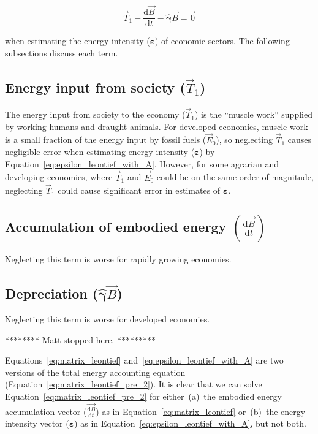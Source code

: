 \begin{equation} \label{eq:literature_assumption}
	\vec{T}_{1}
	- \frac{\mathrm{d}\vec{B}}{\mathrm{d}t} 
	- \hat{\bm{\gamma}}\vec{B} 
	= \vec{0}
\end{equation}

\noindent{}when estimating the energy intensity ($\bm{\varepsilon}$) 
of economic sectors. 
The following subsections discuss each term.

\subsection{Energy input from society ($\vec{T}_{1}$)}

The energy input from society to the economy ($\vec{T}_{1}$)
is the ``muscle work'' supplied by working humans 
and draught animals.\cite{Ayres:2003ec,Warr:2012cg} 
For developed economies, muscle work is a small fraction
of the energy input by fossil fuels ($\vec{E}_{0}$),
so neglecting $\vec{T}_{1}$ causes negligible error when
estimating energy intensity ($\bm{\varepsilon}$) by
Equation~\ref{eq:epsilon_leontief_with_A}.
However, for some agrarian and developing economies, 
where $\vec{T}_{1}$ and $\vec{E}_{0}$ 
could be on the same order of magnitude,
neglecting $\vec{T}_{1}$ could cause significant error
in estimates of $\bm{\varepsilon}$.


\subsection{Accumulation of embodied energy
$\left( \frac{\mathrm{d}\vec{B}}{\mathrm{d}t} \right)$}

Neglecting this term is worse for rapidly growing economies.



\subsection{Depreciation ($\hat{\bm{\gamma}}\vec{B}$)}

Neglecting this term is worse for developed economies.






******** Matt stopped here. *********

Equations~\ref{eq:matrix_leontief} and~\ref{eq:epsilon_leontief_with_A}
are two versions of the total energy 
accounting equation (Equation~\ref{eq:matrix_leontief_pre_2}).
It is clear that we can solve Equation~\ref{eq:matrix_leontief_pre_2} 
for either~(a)~the embodied energy accumulation
vector ($\vec{\frac{\mathrm{d}B}{\mathrm{d}t}}$) 
as in Equation~\ref{eq:matrix_leontief} 
or~(b)~the energy intensity vector ($\bm{\varepsilon}$) as in
Equation~\ref{eq:epsilon_leontief_with_A}, 
but not both.




